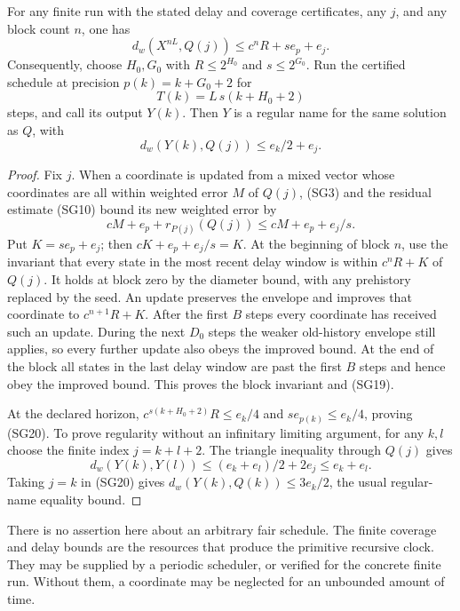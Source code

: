 \begin{theorem}
\label{thm:async-small-gain}
For any finite run with the stated delay and coverage certificates, any
$j$, and any block count $n$, one has
\begin{equation}
 d_w(X^{nL},Q(j))\le c^nR+se_p+e_j.            \tag{SG19}
\end{equation}
Consequently, choose $H_0,G_0$ with $R\le2^{H_0}$ and $s\le2^{G_0}$.
Run the certified schedule at precision
$p(k)=k+G_0+2$ for
\[
 T(k)=L\,s(k+H_0+2)
\]
steps, and call its output $Y(k)$.  Then $Y$ is a regular name for the same
solution as $Q$, with
\begin{equation}
 d_w(Y(k),Q(j))\le e_k/2+e_j.                  \tag{SG20}
\end{equation}
\end{theorem}
\begin{proof}
Fix $j$.  When a coordinate is updated from a mixed vector whose
coordinates are all within weighted error $M$ of $Q(j)$, (SG3) and the
residual estimate (SG10) bound its new weighted error by
\[
 cM+e_p+r_{P(j)}(Q(j))
 \le cM+e_p+e_j/s.
\]
Put $K=se_p+e_j$; then $cK+e_p+e_j/s=K$.
At the beginning of block $n$, use the invariant that every state in
the most recent delay window is within $c^nR+K$ of $Q(j)$.
It holds at block zero by the diameter bound, with any prehistory replaced
by the seed.  An update preserves the envelope and improves that coordinate
to $c^{n+1}R+K$.  After the first $B$ steps every coordinate has received
such an update.  During the next $D_0$ steps the weaker old-history
envelope still applies, so every further update also obeys the improved
bound.  At the end of the block all states in the last delay window are
past the first $B$ steps and hence obey the improved bound.  This proves
the block invariant and (SG19).

At the declared horizon, $c^{s(k+H_0+2)}R\le e_k/4$ and
$se_{p(k)}\le e_k/4$, proving (SG20).
To prove regularity without an infinitary limiting argument, for any
$k,l$ choose the finite index $j=k+l+2$.  The triangle inequality through
$Q(j)$ gives
\[
 d_w(Y(k),Y(l))\le(e_k+e_l)/2+2e_j\le e_k+e_l.
\]
Taking $j=k$ in (SG20) gives
$d_w(Y(k),Q(k))\le3e_k/2$, the usual regular-name equality bound.
\end{proof}

There is no assertion here about an arbitrary fair schedule.  The finite
coverage and delay bounds are the resources that produce the primitive
recursive clock.  They may be supplied by a periodic scheduler, or verified
for the concrete finite run.  Without them, a coordinate may be neglected
for an unbounded amount of time.

